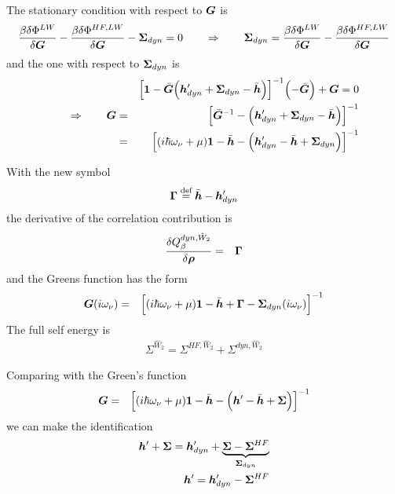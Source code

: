 \documentclass[11pt,a4paper]{report}
\begin{document}
The stationary condition with respect to $\bm{G}$ is
\begin{eqnarray}
\frac{\beta\delta\Phi^{LW}}{\delta\bm{G}}
-\frac{\beta\delta\Phi^{HF,LW}}{\delta\bm{G}}-\bm{\Sigma}_{dyn}=0
\qquad\Rightarrow\qquad
\bm{\Sigma}_{dyn}=\frac{\beta\delta\Phi^{LW}}{\delta\bm{G}}
-\frac{\beta\delta\Phi^{HF,LW}}{\delta\bm{G}}
\end{eqnarray}
and the one with respect to $\bm{\Sigma}_{dyn}$ is
\begin{eqnarray}
&&\Bigl[
\bm{1}-\bar{\bm{G}}
\Bigl(\bm{h}'_{dyn}+\bm{\Sigma}_{dyn}-\bar{\bm{h}}\Bigr)
\Bigr]^{-1}\Bigl(-\bar{\bm{G}}\Bigr)+\bm{G}=0
\nonumber\\
\qquad\Rightarrow\qquad
\bm{G}&=&\Bigl[\bar{\bm{G}}^{-1}-
\Bigl(\bm{h}'_{dyn}+\bm{\Sigma}_{dyn}-\bar{\bm{h}}\Bigr)
\Bigr]^{-1}
\nonumber\\
&=&\Bigl[(i\hbar\omega_\nu+\mu)\bm{1}-\bar{\bm{h}}
  -\Bigl(\bm{h}'_{dyn}-\bar{\bm{h}}+\bm{\Sigma}_{dyn}\Bigr)
\Bigr]^{-1}
\end{eqnarray}

\begin{myshadowminipage}{}
With the new symbol
\begin{eqnarray}
\bm{\Gamma}\stackrel{\text{def}}{=}\bar{\bm{h}}-\bm{h}'_{dyn}
\label{eq:defgammalagrangeq}
\end{eqnarray}
the derivative of the correlation contribution is
\begin{eqnarray}
\frac{\delta Q_{\beta}^{dyn,\hat{W}_2}}{\delta\bm{\rho}}
&=&\bm{\Gamma}
\end{eqnarray}
and the Greens function has the form
\begin{eqnarray}
\bm{G}(i\omega_\nu)&=&\Bigl[(i\hbar\omega_\nu+\mu)\bm{1}-\bar{\bm{h}}
  +\bm{\Gamma}-\bm{\Sigma}_{dyn}(i\omega_\nu)
\Bigr]^{-1}
\end{eqnarray}
The full self energy is
\begin{eqnarray}
\Sigma^{\hat{W}_2}=
\Sigma^{HF,\hat{W}_2}+\Sigma^{dyn,\hat{W}_2}
\end{eqnarray}
\end{myshadowminipage}



Comparing with the Green's function 
\begin{eqnarray}
\bm{G}&=&\Bigl[(i\hbar\omega_\nu+\mu)\bm{1}-\bar{\bm{h}}
  -\Bigl(\bm{h}'-\bar{\bm{h}}+\bm{\Sigma}\Bigr)
\Bigr]^{-1}
\end{eqnarray}
we can make the identification
\begin{eqnarray}
\bm{h}'+\bm{\Sigma}=\bm{h}'_{dyn}+
\underbrace{\bm{\Sigma}
-\bm{\Sigma}^{HF}}_{\bm{\Sigma}_{dyn}}
\nonumber\\
\bm{h}'=\bm{h}'_{dyn}-\bm{\Sigma}^{HF}
\end{eqnarray}
\end{document}
